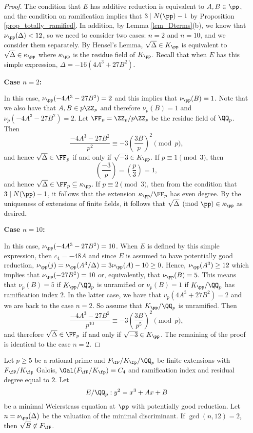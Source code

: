\begin{proof}
    The condition that $E$ has additive reduction is equivalent to $A,B\in\pp$, and the condition on ramification implies that $3\mid N(\pp)-1$ by Proposition \ref{prop_totally_ramified}. In addition, by Lemma \ref{lem_Dterms}(b), we know that $\nu_\pp(\Delta)<12$, so we need to consider two cases: $n=2$ and $n=10$, and we consider them separately. By Hensel's Lemma, $\sqrt{\Delta}\in K_\pp$ is equivalent to $\sqrt{\Delta}\in \kappa_\pp$ where $\kappa_\pp$ is the residue field of $K_\pp$. Recall that when $E$ has this simple expression, $\Delta=-16(4A^3+27B^2)$.


    \textbf{Case $n=2$:}

    In this case, $\nu_\pp(-4A^3-27B^2)=2$ and this implies that $\nu_\pp(B)=1$. Note that we also have that $A,B\in p\ZZ_p$ and therefore $\nu_p(B)=1$ and $\nu_p(-4A^3-27B^2)=2$. Let $\FF_p=\ZZ_p/p\ZZ_p$ be the residue field of $\QQ_p$. Then 
    $$\frac{-4A^3-27B^2}{p^2}\equiv -3\left(\frac{3B}{p}\right)^2\pmod{p},$$
    and hence $\sqrt{\Delta}\in\FF_p$ if and only if $\sqrt{-3}\in K_\pp$. 
    If $p\equiv1\pmod{3}$, then
    $$\left(\frac{-3}{p}\right)=\left(\frac{p}{3}\right)=1,$$
    and hence $\sqrt{\Delta}\in \FF_p\subseteq \kappa_\pp$. If $p\equiv 2\pmod{3}$, then from the condition that $3\mid N(\pp)-1$, it follows that the extension $\kappa_\pp/\FF_p$ has even degree. By the uniqueness of extensions of finite fields, it follows that $\sqrt{\Delta}\pmod{\pp}\in\kappa_\pp$ as desired.

    \textbf{Case $n=10$:} 

    In this case, $\nu_\pp(-4A^3-27B^2)=10$. When $E$ is defined by this simple expression, then $c_4=-48A$ and since $E$ is assumed to have potentially good reduction, $\nu_\pp(j)=\nu_\pp(A^3/\Delta)=3\nu_\pp(A)-10\geq 0$. Hence, $\nu_\pp(A^3)\geq12$ which implies that $\nu_\pp(-27B^2)=10$ or, equivalently, that $\nu_\pp(B)=5$. This means that $\nu_p(B)=5$ if $K_\pp/\QQ_p$ is unramified or $\nu_p(B)=1$ if $K_\pp/\QQ_p$ has ramification index $2$. In the latter case, we have that $v_p(4A^3+27B^2)=2$ and we are back to the case $n=2$. So assume that $K_\pp/\QQ_p$ is unramified. Then
    $$\frac{-4A^3-27B^2}{p^{10}}\equiv -3\left(\frac{3B}{p^5}\right)^2\pmod{p},$$
    and therefore $\sqrt{\Delta}\in\FF_p$ if and only if $\sqrt{-3}\in K_\pp$. The remaining of the proof is identical to the case $n=2$.
\end{proof}

\begin{lemma}\label{lem_notthree}
    Let $p\geq 5$ be a rational prime and $F_\fP/K_\fp/\QQ_p$ be finite extensions with $F_\fP/K_\fp$ Galois, $\Gal(F_\fP/K_\fp)=C_4$ and ramification index and residual degree equal to $2$. Let $$E/\QQ_p:y^2=x^3+Ax+B$$ be a minimal Weierstrass equation at $\pp$ with potentially good reduction. Let $n=\nu_\pp(\Delta)$ be the valuation of the minimal discriminant. If $\gcd(n,12)=2$, then $\sqrt{B}\not\in F_\fP$.
\end{lemma}


